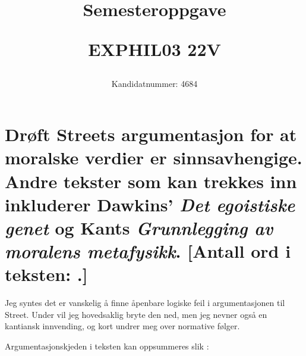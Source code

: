 \documentclass[a4paper,norsk]{article}
\title{\sf Semesteroppgave \par {\large EXPHIL03 22V\par}}
\author{\sf Kandidatnummer: 4684}
\date{}
\begin{document}
\maketitle

\section*{\normalsize\sf%
  Drøft Streets argumentasjon for at moralske verdier er sinnsavhengige. Andre
  tekster som kan trekkes inn inkluderer Dawkins' \emph{Det egoistiske genet}
  og Kants \emph{Grunnlegging av moralens metafysikk}. [Antall ord i teksten:
  .]
}

Jeg syntes det er vanskelig å finne åpenbare logiske feil i argumentasjonen til
Street. Under vil jeg hovedsaklig bryte den ned, men jeg nevner også en
kantiansk innvending, og kort undrer meg over normative følger.

Argumentasjonskjeden i teksten kan oppsummeres slik \autocite{street}:

\end{document}
